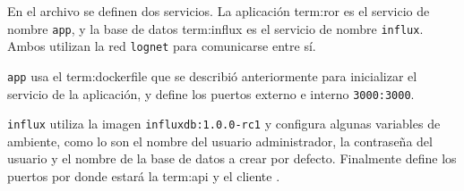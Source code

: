 En el archivo se definen dos servicios. La aplicación \gls{term:ror} es el
servicio de nombre \lstinline{app}, y la base de datos \gls{term:influx} es el
servicio de nombre \lstinline{influx}. Ambos utilizan la red \lstinline{lognet}
para comunicarse entre sí.

\lstinline{app} usa el \gls{term:dockerfile} que se describió anteriormente para
inicializar el servicio de la aplicación, y define los puertos externo e interno
\lstinline{3000:3000}.

\lstinline{influx} utiliza la imagen \lstinline{influxdb:1.0.0-rc1} y configura
algunas variables de ambiente, como lo son el nombre del usuario administrador,
la contraseña del usuario y el nombre de la base de datos a crear por defecto.
Finalmente define los puertos por donde estará la \gls{term:api} y el cliente
.
